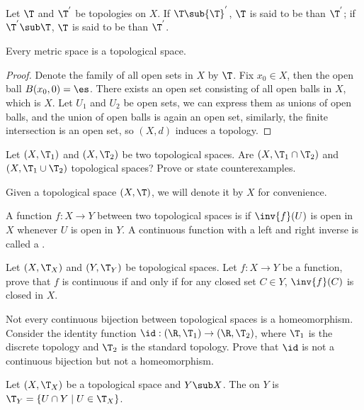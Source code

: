 \documentclass[10pt]{article}
\begin{document}
\begin{definition}
    Let $\T$ and ${\T}^{'}$ be topologies on $X$. If $\T\sub{\T}^{'}$, $\T$ is said to be  than ${\T}^{'}$; if ${\T}^{'}\sub\T$, $\T$ is said to be  than ${\T}^{'}$.
\end{definition}
\begin{proposition}
    Every metric space is a topological space.
\end{proposition}
\begin{proof}
    Denote the family of all open sets in $X$ by $\T$. Fix ${x}_{0}\in X$, then the open ball $B({x}_{0},0)=\es$. There exists an open set consisting of all open balls in $X$, which is $X$. Let ${U}_{1}$ and ${U}_{2}$ be open sets, we can express them as unions of open balls, and the union of open balls is again an open set, similarly, the finite intersection is an open set, so $(X,d)$ induces a topology.
\end{proof}
\begin{problem}
    Let $(X,{\T}_{1})$ and $(X,{\T}_{2})$ be two topological spaces. Are $(X,{\T}_{1}\cap{\T}_{2})$ and $(X,{\T}_{1}\cup{\T}_{2})$ topological spaces? Prove or state counterexamples.
\end{problem}
\begin{remark}
    Given a topological space $(X,\T)$, we will denote it by $X$ for convenience.
\end{remark}
\begin{definition}
    A function $f:X\to Y$ between two topological spaces is  if $\inv{f}(U)$ is open in $X$ whenever $U$ is open in $Y$. A continuous function with a left and right inverse is called a .
\end{definition}
\begin{problem}
    Let $(X,{\T}_{X})$ and $(Y,{\T}_{Y})$ be topological spaces. Let $f:X\to Y$ be a function, prove that $f$ is continuous if and only if for any closed set $C\in Y$, $\inv{f}(C)$ is closed in $X$.
\end{problem}
\begin{problem}
    Not every continuous bijection between topological spaces is a homeomorphism. Consider the identity function $\id:(\R,{\T}_{1})\to(\R,{\T}_{2})$, where ${\T}_{1}$ is the discrete topology and ${\T}_{2}$ is the standard topology. Prove that $\id$ is not a continuous bijection but not a homeomorphism.
\end{problem}
\begin{definition}
    Let $(X,{\T}_{X})$ be a topological space and $Y\sub X$. The  on $Y$ is ${\T}_{Y}=\{U\cap Y\mid U\in{\T}_{X}\}$.
\end{definition}
\end{document}
